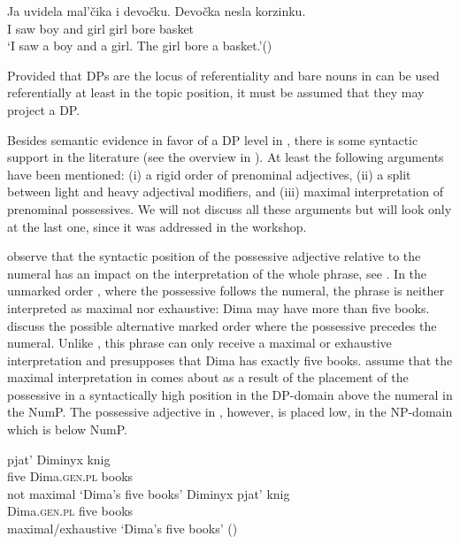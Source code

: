 \documentclass[output=paper]{langscibook}
\begin{document}
\ea \label{ex:2}
\gll Ja uvidela mal'čika i devočku. Devočka nesla korzinku. \\
    I saw boy and girl girl bore basket\\
\glt `I saw a boy and a girl. The girl bore a basket.'\hfill ()
\z

\noindent Provided that DPs are the locus of referentiality and bare nouns in  can be used referentially at least in the topic position, it must be assumed that they may project a DP.

Besides semantic evidence in favor of a DP level in , there is some syntactic support in the literature (see the overview in \citealt{Pereltsvaig2013}). At least the following arguments have been mentioned: (i) a rigid order of prenominal adjectives, (ii) a split between light and heavy adjectival modifiers, and (iii) maximal interpretation of prenominal possessives. We will not discuss all these arguments but will look only at the last one, since it was addressed in the workshop.

\citet{Kagan.Pereltsvaig2014} observe that the syntactic position of the possessive adjective relative to the numeral has an impact on the interpretation of the whole phrase, see . In the unmarked order , where the possessive follows the numeral, the phrase is neither interpreted as maximal nor exhaustive: Dima may have more than five books. \citet{Kagan.Pereltsvaig2014} discuss the possible alternative marked order  where the possessive precedes the numeral. Unlike , this phrase can only receive a maximal or exhaustive interpretation and presupposes that Dima has exactly five books. \citet{Kagan.Pereltsvaig2014} assume that the maximal interpretation in  comes about as a result of the placement of the possessive in a syntactically high position in the DP-domain above the numeral in the NumP. The possessive adjective in , however, is placed low, in the NP-domain which is below NumP.

\ea \label{ex:3}
\ea
\gll pjat' Diminyx knig \\
    five Dima.\textsc{gen.pl} books\\ \hfill not maximal
\glt `Dima’s five books' \label{ex:3a}
\ex \gll Diminyx pjat' knig \\
 Dima.\textsc{gen.pl} five books\\ \hfill maximal/exhaustive
\glt `Dima's five books' \hfill () \label{ex:3b}
\z \z
\end{document}
